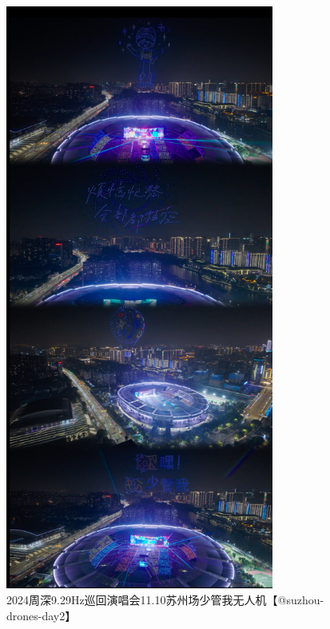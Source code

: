 \documentclass[]{ctexbook}
\begin{document}
\begin{figure}

{\centering \includegraphics[width=250pt]{img/suzhou20241110/002} 

}

\caption{2024周深9.29Hz巡回演唱会11.10苏州场少管我无人机【@suzhou-drones-day2】}\label{fig:unnamed-chunk-138}
\end{figure}
\end{document}
